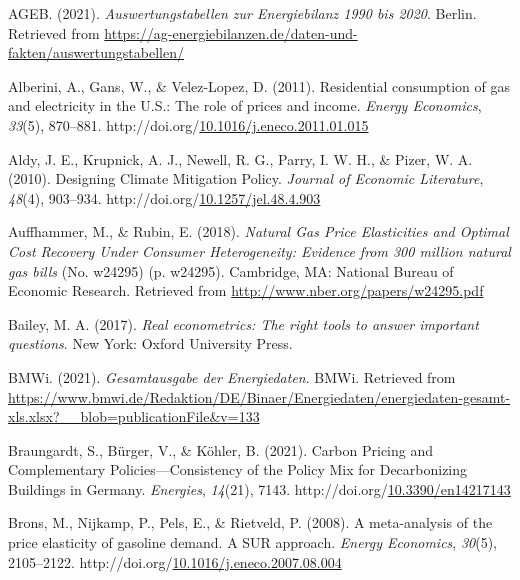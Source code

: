 \documentclass[12pt,twoside]{reedthesis}
\newlength{\cslhangindent}
\newenvironment{CSLReferences}[2] %
 {%
  \setlength{\parindent}{0pt}
  \ifodd #1 \everypar{\setlength{\hangindent}{\cslhangindent}}\ignorespaces\fi
  \ifnum #2 > 0
  \setlength{\parskip}{#2\baselineskip}
  \fi
 }%
 {}
\begin{document}
\hypertarget{refs}{}
\begin{CSLReferences}{1}{0}
\leavevmode{}%
AGEB. (2021). \emph{Auswertungstabellen zur Energiebilanz 1990 bis 2020}. Berlin. Retrieved from \url{https://ag-energiebilanzen.de/daten-und-fakten/auswertungstabellen/}

\leavevmode{}%
Alberini, A., Gans, W., \& Velez-Lopez, D. (2011). Residential consumption of gas and electricity in the U.S.: The role of prices and income. \emph{Energy Economics}, \emph{33}(5), 870--881. http://doi.org/\href{https://doi.org/10.1016/j.eneco.2011.01.015}{10.1016/j.eneco.2011.01.015}

\leavevmode{}%
Aldy, J. E., Krupnick, A. J., Newell, R. G., Parry, I. W. H., \& Pizer, W. A. (2010). Designing Climate Mitigation Policy. \emph{Journal of Economic Literature}, \emph{48}(4), 903--934. http://doi.org/\href{https://doi.org/10.1257/jel.48.4.903}{10.1257/jel.48.4.903}

\leavevmode{}%
Auffhammer, M., \& Rubin, E. (2018). \emph{Natural Gas Price Elasticities and Optimal Cost Recovery Under Consumer Heterogeneity: Evidence from 300 million natural gas bills} (No. w24295) (p. w24295). Cambridge, MA: National Bureau of Economic Research. Retrieved from \url{http://www.nber.org/papers/w24295.pdf}

\leavevmode{}%
Bailey, M. A. (2017). \emph{Real econometrics: The right tools to answer important questions}. New York: Oxford University Press.

\leavevmode{}%
BMWi. (2021). \emph{Gesamtausgabe der Energiedaten}. BMWi. Retrieved from \url{https://www.bmwi.de/Redaktion/DE/Binaer/Energiedaten/energiedaten-gesamt-xls.xlsx?__blob=publicationFile\&v=133}

\leavevmode{}%
Braungardt, S., Bürger, V., \& Köhler, B. (2021). Carbon Pricing and Complementary Policies---Consistency of the Policy Mix for Decarbonizing Buildings in Germany. \emph{Energies}, \emph{14}(21), 7143. http://doi.org/\href{https://doi.org/10.3390/en14217143}{10.3390/en14217143}

\leavevmode{}%
Brons, M., Nijkamp, P., Pels, E., \& Rietveld, P. (2008). A meta-analysis of the price elasticity of gasoline demand. A SUR approach. \emph{Energy Economics}, \emph{30}(5), 2105--2122. http://doi.org/\href{https://doi.org/10.1016/j.eneco.2007.08.004}{10.1016/j.eneco.2007.08.004}


\end{CSLReferences}
\end{document}
